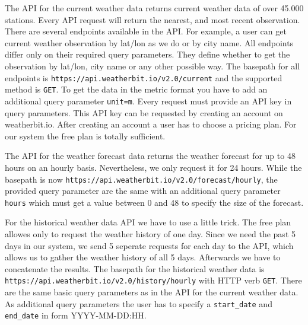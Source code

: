 The API for the current weather data returns current weather data of over 45.000 stations.
Every API request will return the nearest, and most recent observation.
There are several endpoints available in the API.
For example, a user can get current weather observation by lat/lon as we do or by city name.
All endpoints differ only on their required query parameters.
They define whether to get the observation by lat/lon, city name or any other possible way.
The basepath for all endpoints is \texttt{https://api.weatherbit.io/v2.0/current} and the supported method is \texttt{GET}.
To get the data in the metric format you have to add an additional query parameter \texttt{unit=m}.
Every request must provide an API key in query parameters\cite{weatherbit}.
This API key can be requested by creating an account on weatherbit.io.
After creating an account a user has to choose a pricing plan.
For our system the free plan is totally sufficient.

The API for the weather forecast data returns the weather forecast for up to 48 hours on an hourly basis.
Nevertheless, we only request it for 24 hours.
While the basepath is now \texttt{https://api.weatherbit.io/v2.0/forecast/hourly}, the provided query parameter are the same with an additional query parameter \texttt{hours} which must get a value between 0 and 48 to specify the size of the forecast.

For the historical weather data API we have to use a little trick.
The free plan allowes only to request the weather history of one day.
Since we need the past 5 days in our system, we send 5 seperate requests for each day to the API, which allows us to gather the weather history of all 5 days.
Afterwards we have to concatenate the results.
The basepath for the historical weather data is \texttt{https://api.weatherbit.io/v2.0/history/hourly} with HTTP verb \texttt{GET}.
There are the same basic query parameters as in the API for the current weather data.
As additional query parameters the user has to specify a \texttt{start\_date} and \texttt{end\_date} in form YYYY-MM-DD:HH.

